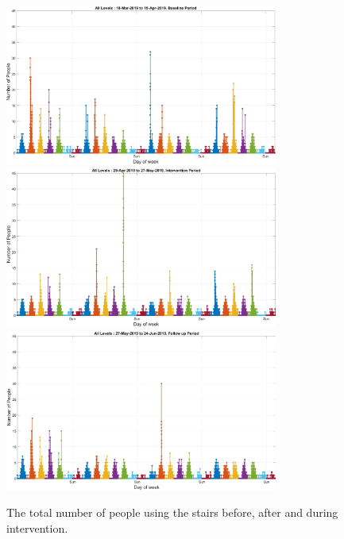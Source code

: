 \documentclass[../UNBThesis2.tex]{subfiles}
\begin{document}
 
\begin{figure}[htbp]
    \includegraphics[width=0.8\textwidth]{image/Chapters/Chapter6/18-Mar-2019Base.jpg}
    \includegraphics[width=0.8\textwidth]{image/Chapters/Chapter6/29-Apr-2019Int.jpg}
    \includegraphics[width=0.8\textwidth]{image/Chapters/Chapter6/27-May-2019Follow.jpg}
    \caption{The total number of people using the stairs before, after and during intervention.}
    \label{3mon}
\end{figure}
\end{document}
